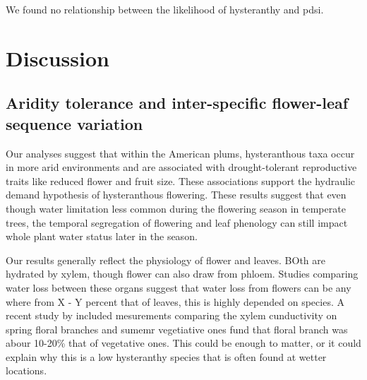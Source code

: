 \documentclass{article}\usepackage[]{graphicx}\usepackage[]{color}
\begin{document}
We found no relationship between the likelihood of hysteranthy and pdsi.




\section*{Discussion}
\subsection*{Aridity tolerance and inter-specific flower-leaf sequence variation}
Our analyses suggest that within the American plums, hysteranthous taxa occur in more arid environments and are associated with drought-tolerant reproductive traits like reduced flower and fruit size. These associations support the hydraulic demand hypothesis of hysteranthous flowering. These results suggest that even though water limitation less common during the flowering season in temperate trees, the temporal segregation of flowering and leaf phenology can still impact whole plant water status later in the season.

Our results generally reflect the physiology of flower and leaves. BOth are hydrated by xylem, though flower can also draw from phloem. Studies comparing water loss between these organs suggest that water loss from flowers can be any where from X - Y percent that of leaves, this is highly depended on species.
A recent study by \citet{} included mesurements comparing the xylem cunductivity on spring floral branches and sumemr vegetiative ones fund that floral branch was abour 10-20\% that of vegetative ones. 
This could be enough to matter, or it could explain why this is a low hysteranthy species that is often found at wetter locations.
\end{document}
